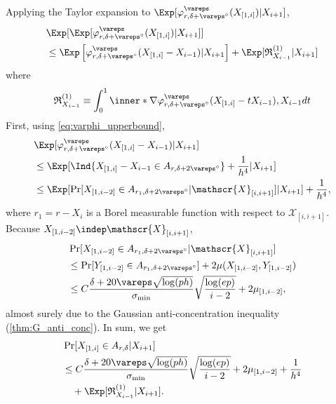 \documentclass[aos]{imsart}
\begin{document}
\medskip
{}
Applying the Taylor expansion to $\Exp[\varphi_{r,\delta+\vareps^\circ}^\vareps(X_{[1,i]}) 
    | X_{i+1}] $,
\begin{equation*}
\begin{aligned}
    & \Exp[\Exp[\varphi_{r,\delta+\vareps^\circ}^\vareps(X_{[1,i]}) 
    | X_{i+1}]] \\
    & \leq \Exp\left[ 
        \varphi_{r,\delta+\vareps^\circ}^\vareps(X_{[1,i]} - X_{i-1}) | X_{i+1}
    \right]
    + \Exp[ \mathfrak{R}_{X_{i-1}}^{(1)} | X_{i+1} ] \\
\end{aligned}
\end{equation*}
where 
\begin{equation*}
    \mathfrak{R}_{X_{i-1}}^{(1)}
    \equiv \int_0^1 \inner*{
        \nabla \varphi_{r,\delta+\vareps^\circ}^\vareps(X_{[1,i]} - t X_{i-1}),
        X_{i-1}
    } dt
\end{equation*}
First, using \cref{eq:varphi_upperbound}, 
\begin{equation*}
\begin{aligned}
    & \Exp[\varphi_{r,\delta+\vareps^\circ}^\vareps(X_{[1,i]} - X_{i-1}) | X_{i+1}] \\
    & \leq \Exp[\Ind\{X_{[1,i]} - X_{i-1} \in A_{r,\delta+2\vareps^\circ}\} 
    + \frac{1}{h^4} | X_{i+1}] \\
    & \leq \Exp[\Pr[X_{[1,i-2]} \in A_{r_1, \delta + 2\vareps^\circ} | \mathscr{X}_{[i, i+1]}] | X_{i+1}] + \frac{1}{h^4},
\end{aligned}
\end{equation*}
where $r_1 = r - X_{i}$ is a Borel measurable function with respect to $\mathscr{X}_{[i,i+1]}$. Because $X_{[1,i-2]} \indep \mathscr{X}_{[i, i+1]}$, 
\begin{equation} \label{eq:anti_concentration_H1}
\begin{aligned}
    & \Pr[X_{[1,i-2]} \in A_{r_1, \delta+2\vareps^\circ} | \mathscr{X}_{[i,i+1]}] \\
    & \leq \Pr[Y_{[1,i-2]} \in A_{r_1, \delta+2\vareps^\circ} ] 
    + 2\mu(X_{[1,i-2]}, Y_{[1,i-2]}) \\
    & \leq C\frac{\delta + 20\vareps\sqrt{\log(ph)}}{\sigma_{\min}} \sqrt{\frac{\log(ep)}{i-2}}
    + 2\mu_{[1,i-2]},
\end{aligned}
\end{equation}
almost surely due to the Gaussian anti-concentration inequality (\cref{thm:G_anti_conc}).
In sum, we get 
\begin{equation} \label{eq:anti_concentration_Taylor_N}
\begin{aligned}
    & \Pr[X_{[1,i]} \in A_{r,\delta} | X_{i+1}] \\
    & \leq C\frac{\delta + 20\vareps\sqrt{\log(ph)}}{\sigma_{\min}} \sqrt{\frac{\log(ep)}{i-2}}
    + 2\mu_{[1,i-2]} 
    + \frac{1}{h^4} \\
    & \quad + \Exp[ \mathfrak{R}_{X_{i-1}}^{(1)} | X_{i+1} ].
\end{aligned}
\end{equation}
\end{document}
